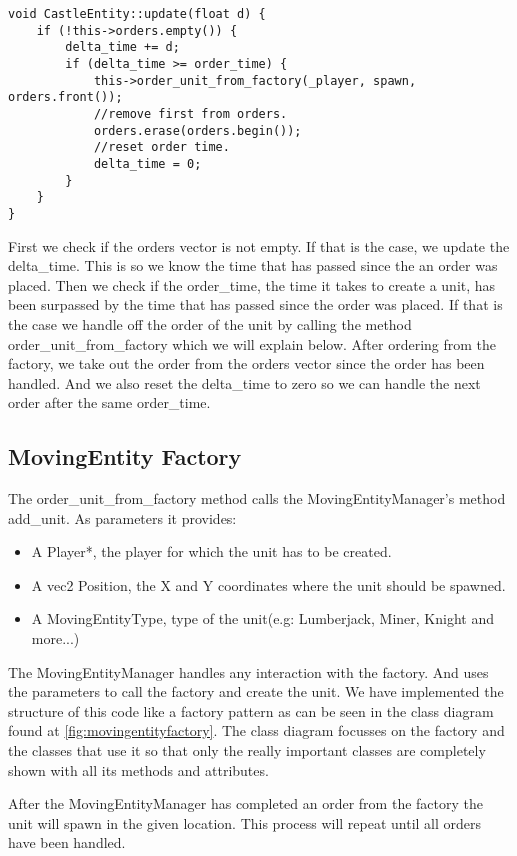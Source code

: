 \begin{lstlisting} 
void CastleEntity::update(float d) {
    if (!this->orders.empty()) { 
        delta_time += d; 
        if (delta_time >= order_time) {
            this->order_unit_from_factory(_player, spawn, orders.front());
            //remove first from orders.  
            orders.erase(orders.begin());
            //reset order time.  
            delta_time = 0; 
        } 
    } 
} 
\end{lstlisting}

First we check if the orders vector is not empty. If that is the case, we 
update the delta\_time. This is so we know the time that has passed since the 
an order was placed. Then we check if the order\_time, the time it takes to 
create a unit, has been surpassed by the time that has passed since the order 
was placed. If that is the case we handle off the order of the unit by calling 
the method order\_unit\_from\_factory which we will explain below. After 
ordering from the factory, we take out the order from the orders vector since 
the order has been handled. And we also reset the delta\_time to zero so we 
can handle the next order after the same order\_time.

\subsection{MovingEntity Factory} 
The order\_unit\_from\_factory method calls the MovingEntityManager's method 
add\_unit. As parameters it provides:

\begin{itemize}  
    \item A Player*, the player for which the unit has to be created.  
    \item A vec2 Position, the X and Y coordinates where the unit should be 
    spawned.  
    \item A MovingEntityType, type of the unit(e.g: Lumberjack, Miner, Knight 
    and more...) 
\end{itemize} 

The MovingEntityManager handles any interaction with the factory. And uses the 
parameters to call the factory and create the unit. We have implemented the 
structure of this code like a factory pattern as can be seen in the class 
diagram found at \cref{fig:movingentityfactory}. The class diagram focusses on 
the factory and the classes that use it so that only the really important 
classes are completely shown with all its methods and attributes.  

After the MovingEntityManager has completed an order from the factory the unit
will spawn in the given location. This process will repeat until all orders
have been handled.
